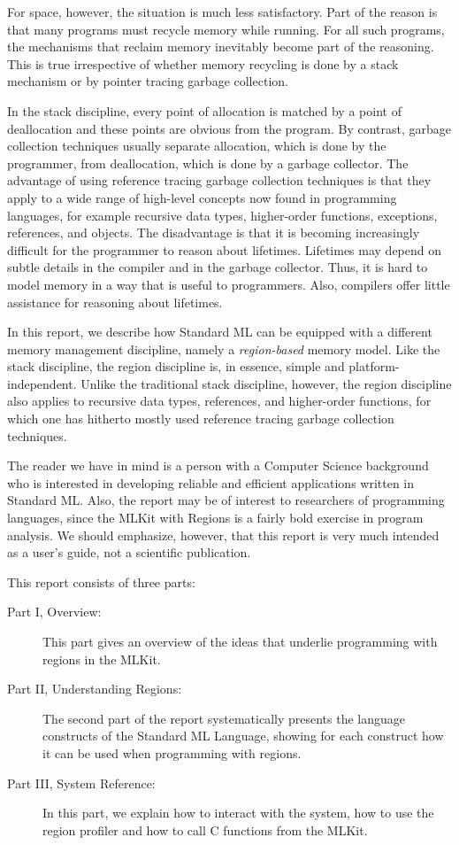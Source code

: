\documentclass[12pt]{book}
\begin{document}
For space, however, the situation is much less satisfactory. Part of
the reason is that many programs must recycle memory while running.
For all such programs, the mechanisms that reclaim memory inevitably
become part of the reasoning.  This is true irrespective of whether
memory recycling is done by a
%
stack mechanism or by pointer tracing garbage collection.

In the stack discipline, every point of allocation is matched by a
point of deallocation and these points are obvious from the
program. By contrast, garbage collection techniques usually separate
allocation, which is done by the programmer, from deallocation, which
is done by a garbage collector.  The advantage of using reference
tracing
%
garbage collection techniques is that they apply to a wide range of
high-level concepts now found in programming languages, for example
recursive data types, higher-order functions, exceptions, references,
and objects. The disadvantage is that it is becoming increasingly
difficult for the programmer to reason about lifetimes. Lifetimes may
depend on subtle details in the compiler and in the garbage collector.
Thus, it is hard to model memory in a way that is useful to
programmers. Also, compilers offer little assistance for reasoning
about lifetimes.

In this report, we describe how Standard ML can be equipped with a different memory
management discipline, namely a {\em region-based} memory model.  Like
the stack discipline, the region discipline is, in essence, simple and
platform-independent. Unlike the traditional stack discipline,
however, the region discipline also applies to recursive data types,
references, and higher-order functions, for which one has hitherto
mostly used reference tracing garbage collection techniques.

The reader we have in mind is a person with a Computer Science
background who is interested in developing reliable and efficient
applications written in Standard ML. Also, the report may be of
interest to researchers of programming languages, since the MLKit
with Regions is a fairly bold exercise in program analysis. We should
emphasize, however, that this report is very much intended as a user's
guide, not a scientific publication.

This report consists of three parts:
\begin{description}
\item[Part I, Overview:] This part gives an overview of the ideas
  that underlie programming with regions in the MLKit.
\item[Part II, Understanding Regions:] The second part of the report
  systematically presents the language constructs of the Standard ML
  Language, showing for each construct how it can be used when
  programming with regions.
\item[Part III, System Reference:] In this part, we explain how to
  interact with the system, how to use the region profiler and how to
  call C functions from the MLKit.
\end{description}
\end{document}
